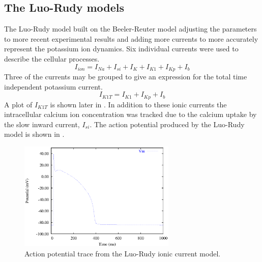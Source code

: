 \subsection{The Luo-Rudy models}
\label{sec:The_Luo-Rudy_I_model}
The Luo-Rudy model \cite{luo:1991} built on the Beeler-Reuter model adjusting the
parameters to more recent experimental results and adding more currents to
more accurately represent the potassium ion dynamics. Six individual currents
were used to describe the cellular processes.
\begin{equation}
  I_{ion}=I_{Na}+I_{si}+I_{K}+I_{K1}+I_{Kp}+I_{b}
\end{equation}
Three of the currents may be grouped to give an expression for the total time
independent potassium current.
\begin{equation}
  I_{K1T}=I_{K1}+I_{Kp}+I_{b}
\end{equation}
A plot of $I_{K1T}$ is shown later in . In
addition to these ionic currents the intracellular calcium ion
concentration was tracked due to the calcium uptake by the slow inward
current, $I_{si}$. The action potential produced by the Luo-Rudy model is
shown in .
\begin{figure}[hbtp] 
  \centering
  \includegraphics[width=75mm]{cardiac_electrophysiology/epsfiles/LR_Vm.eps}
  \caption[Luo-Rudy action potential]{Action potential trace from the Luo-Rudy
    ionic current model.}
  \label{fig:LR1_ap}
\end{figure}
%

